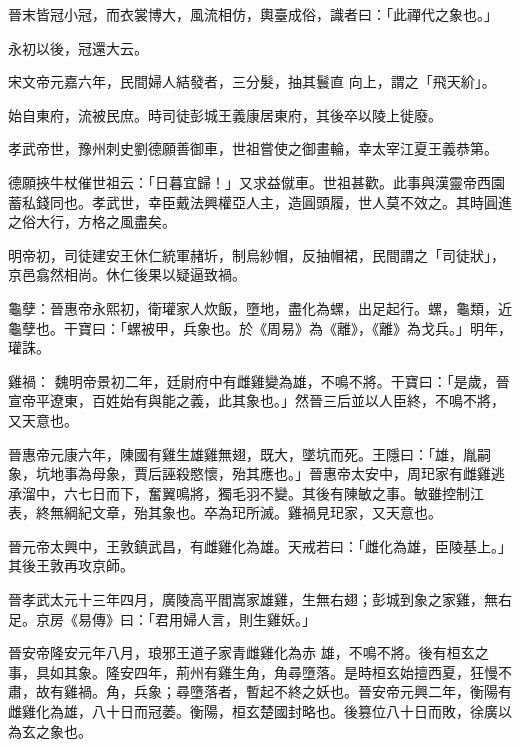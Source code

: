 \begin{pinyinscope}
 晉末皆冠小冠，而衣裳博大，風流相仿，輿臺成俗，識者曰：「此禪代之象也。」



 永初以後，冠還大云。



 宋文帝元嘉六年，民間婦人結發者，三分髮，抽其鬟直
 向上，謂之「飛天紒」。



 始自東府，流被民庶。時司徒彭城王義康居東府，其後卒以陵上徙廢。



 孝武帝世，豫州刺史劉德願善御車，世祖嘗使之御畫輪，幸太宰江夏王義恭第。



 德願挾牛杖催世祖云：「日暮宜歸！」又求益僦車。世祖甚歡。此事與漢靈帝西園蓄私錢同也。孝武世，幸臣戴法興權亞人主，造圓頭履，世人莫不效之。其時圓進之俗大行，方格之風盡矣。



 明帝初，司徒建安王休仁統軍赭圻，制烏紗帽，反抽帽裙，民間謂之「司徒狀」，京邑翕然相尚。休仁後果以疑逼致禍。



 龜孽：晉惠帝永熙初，衛瓘家人炊飯，墮地，盡化為螺，出足起行。螺，龜類，近龜孽也。干寶曰：「螺被甲，兵象也。於《周易》為《離》，《離》為戈兵。」明年，瓘誅。



 雞禍：
 魏明帝景初二年，廷尉府中有雌雞變為雄，不鳴不將。干寶曰：「是歲，晉宣帝平遼東，百姓始有與能之義，此其象也。」然晉三后並以人臣終，不鳴不將，又天意也。



 晉惠帝元康六年，陳國有雞生雄雞無翅，既大，墜坑而死。王隱曰：「雄，胤嗣象，坑地事為母象，賈后誣殺愍懷，殆其應也。」晉惠帝太安中，周𤣱家有雌雞逃承溜中，六七日而下，奮翼鳴將，獨毛羽不變。其後有陳敏之事。敏雖控制江
 表，終無綱紀文章，殆其象也。卒為𤣱所滅。雞禍見𤣱家，又天意也。



 晉元帝太興中，王敦鎮武昌，有雌雞化為雄。天戒若曰：「雌化為雄，臣陵基上。」其後王敦再攻京師。



 晉孝武太元十三年四月，廣陵高平閻嵩家雄雞，生無右翅；彭城到象之家雞，無右足。京房《易傳》曰：「君用婦人言，則生雞妖。」



 晉安帝隆安元年八月，琅邪王道子家青雌雞化為赤
 雄，不鳴不將。後有桓玄之事，具如其象。隆安四年，荊州有雞生角，角尋墮落。是時桓玄始擅西夏，狂慢不肅，故有雞禍。角，兵象；尋墮落者，暫起不終之妖也。晉安帝元興二年，衡陽有雌雞化為雄，八十日而冠萎。衡陽，桓玄楚國封略也。後篡位八十日而敗，徐廣以為玄之象也。




\end{pinyinscope}
